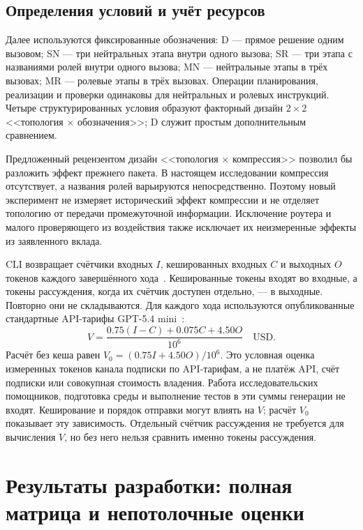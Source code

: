 \subsection{Определения условий и учёт ресурсов}

Далее используются фиксированные обозначения: D --- прямое решение одним вызовом; SN --- три нейтральных этапа внутри одного вызова; SR --- три этапа с названиями ролей внутри одного вызова; MN --- нейтральные этапы в трёх вызовах; MR --- ролевые этапы в трёх вызовах. Операции планирования, реализации и проверки одинаковы для нейтральных и ролевых инструкций. Четыре структурированных условия образуют факторный дизайн $2\times2$ <<топология $\times$ обозначения>>; D служит простым дополнительным сравнением.

Предложенный рецензентом дизайн <<топология $\times$ компрессия>> позволил бы разложить эффект прежнего пакета. В настоящем исследовании компрессия отсутствует, а названия ролей варьируются непосредственно. Поэтому новый эксперимент не измеряет исторический эффект компрессии и не отделяет топологию от передачи промежуточной информации. Исключение роутера и малого проверяющего из воздействия также исключает их неизмеренные эффекты из заявленного вклада.

CLI возвращает счётчики входных $I$, кешированных входных $C$ и выходных $O$ токенов каждого завершённого хода~\cite{codexexec2026}. Кешированные токены входят во входные, а токены рассуждения, когда их счётчик доступен отдельно, --- в выходные. Повторно они не складываются. Для каждого хода используются опубликованные стандартные API-тарифы GPT-5.4 mini~\cite{openai54mini2026,openaipricing2026}:
\begin{equation}
V=\frac{0.75(I-C)+0.075C+4.50O}{10^6}\quad\mathrm{USD}.
\end{equation}
Расчёт без кеша равен $V_0=(0.75I+4.50O)/10^6$. Это условная оценка измеренных токенов канала подписки по API-тарифам, а не платёж API, счёт подписки или совокупная стоимость владения. Работа исследовательских помощников, подготовка среды и выполнение тестов в эти суммы генерации не входят. Кеширование и порядок отправки могут влиять на $V$; расчёт $V_0$ показывает эту зависимость. Отдельный счётчик рассуждения не требуется для вычисления $V$, но без него нельзя сравнить именно токены рассуждения.

\section{Результаты разработки: полная матрица и непотолочные оценки}
\label{sec:dev40-results}


